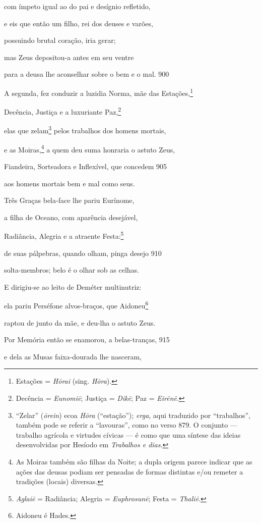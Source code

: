 com ímpeto igual ao do pai e desígnio refletido,

e eis que então um filho, rei dos deuses e varões,

possuindo brutal coração, iria gerar;

mas Zeus depositou-a antes em seu ventre

para a deusa lhe aconselhar sobre o bem e o mal. \num{900}

\quad{}A segunda, fez conduzir a luzidia Norma, mãe das \qb{}Estações,\footnote{Estações = \emph{Hōrai} (sing. \emph{Hōra}).}

Decência, Justiça e a luxuriante Paz,\footnote{Decência = \emph{Eunomiē}; Justiça = \emph{Dikē}; Paz = \emph{Eirēnē}.}

elas que zelam\footnote{``Zelar'' (\emph{ōrein}) ecoa \emph{Hōra} (``estação'');
\emph{erga}, aqui traduzido por ``trabalhos'', também pode se referir a
``lavouras'', como no verso 879. O conjunto --- trabalho agrícola e
virtudes cívicas --- é como que uma síntese das ideias desenvolvidas por
Hesíodo em \emph{Trabalhos e dias}.} pelos trabalhos dos homens mortais,

e as Moiras,\footnote{As Moiras também são filhas da Noite; a dupla origem parece indicar que as ações das deusas podiam ser pensadas de formas distintas e/ou
remeter a tradições (locais) diversas.} a quem deu suma honraria o astuto Zeus,

Fiandeira, Sorteadora e Inflexível, que concedem \num{905}

aos homens mortais bem e mal como seus.

\quad{}Três Graças bela-face lhe pariu Eurínome,

a filha de Oceano, com aparência desejável,

Radiância, Alegria e a atraente Festa:\footnote{\emph{Aglaiē} = Radiância; Alegria = \emph{Euphrosunē}; Festa = \emph{Thaliē}.}

de suas pálpebras, quando olham, pinga desejo \num{910}

solta-membros; belo é o olhar sob as celhas.

\quad{}E dirigiu-se ao leito de Deméter multinutriz:

ela pariu Perséfone alvos-braços, que Aidoneu\footnote{Aidoneu é Hades.}

raptou de junto da mãe, e deu-lha o astuto Zeus.

\quad{}Por Memória então se enamorou, a belas-tranças, \num{915}

e dela as Musas faixa-dourada lhe nasceram,

